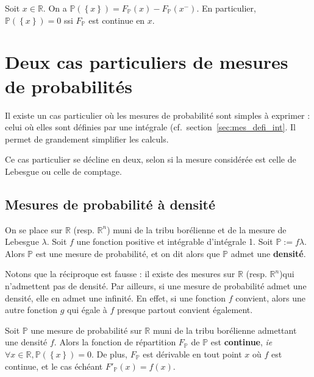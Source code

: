\documentclass[../integ-proba.tex]{subfiles}
\begin{document}
    \begin{cor}
        Soit $x \in \mathbb{R}$.
        On a $\mathbb{P}(\left\{x\right\}) = F_\mathbb{P}(x) - F_\mathbb{P}(x^-)$.
        En particulier, $\mathbb{P}(\left\{x\right\}) = 0$ ssi $F_\mathbb{P}$ est continue en $x$.
    \end{cor}

    \section{Deux cas particuliers de mesures de probabilités}
    \label{sec:probas_mes_particulieres}

    Il existe un cas particulier où les mesures de probabilité sont simples à exprimer : celui où elles sont définies par une intégrale (cf.\ section~\ref{sec:mes_defi_int}.
    Il permet de grandement simplifier les calculs.

    Ce cas particulier se décline en deux, selon si la mesure considérée est celle de Lebesgue ou celle de comptage.

    \subsection{Mesures de probabilité à densité}
    \begin{defi}
        On se place sur $\mathbb{R}$ (resp. $\mathbb{R}^n$) muni de la tribu borélienne et de la mesure de Lebesgue $\lambda$.
        Soit $f$ une fonction positive et intégrable d'intégrale 1.
        Soit $\mathbb{P}:=f \lambda$.
        Alors $\mathbb{P}$ est une mesure de probabilité, et on dit alors que $\mathbb{P}$ admet une \textbf{densité}.
    \end{defi}

    \begin{rem}
        Notons que la réciproque est fausse : il existe des mesures sur $\mathbb{R}$ (resp. $\mathbb{R}^n$)qui n'admettent pas de densité.
        Par ailleurs, si une mesure de probabilité admet une densité, elle en admet une infinité.
        En effet, si une fonction $f$ convient, alors une autre fonction $g$ qui égale à $f$ presque partout convient également. %
    \end{rem}

    \begin{prop}
        Soit $\mathbb{P}$ une mesure de probabilité sur $\mathbb{R}$ muni de la tribu borélienne admettant une densité $f$.
        Alors la fonction de répartition $F_\mathbb{P}$ de $\mathbb{P}$ est \textbf{continue}, \textit{ie} $\forall x \in \mathbb{R}, \mathbb{P}(\left\{ x \right\}) = 0$.
        De plus, $F_\mathbb{P}$ est dérivable en tout point $x$ où $f$ est continue, et le cas échéant $F'_\mathbb{P}(x) = f(x)$.
    \end{prop}
\end{document}
